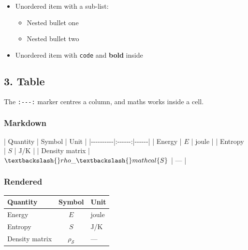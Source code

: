 \documentclass[
]{article}
\newenvironment{Shaded}{}{}
\newcommand{\NormalTok}[1]{#1}
\newcommand{\PreprocessorTok}[1]{\textcolor[rgb]{0.74,0.48,0.00}{#1}}
\newcounter{none} %
\providecommand{\tightlist}{%
  \setlength{\itemsep}{0pt}\setlength{\parskip}{0pt}}
\begin{document}
\begin{itemize}
\tightlist
\item
  Unordered item with a sub-list:

  \begin{itemize}
  \tightlist
  \item
    Nested bullet one
  \item
    Nested bullet two
  \end{itemize}
\item
  Unordered item with \texttt{code} and \textbf{bold} inside
\end{itemize}

\subsection{3. Table}\label{table}

The \texttt{:-\/-\/-:} marker centres a column, and maths works inside a
cell.

\subsubsection{Markdown}\label{markdown-2}

\begin{Shaded}
\begin{Highlighting}[]
\PreprocessorTok{|}\NormalTok{ Quantity }\PreprocessorTok{|}\NormalTok{ Symbol }\PreprocessorTok{|}\NormalTok{ Unit }\PreprocessorTok{|}
\PreprocessorTok{|{-}{-}{-}{-}{-}{-}{-}{-}{-}{-}|:{-}{-}{-}{-}{-}{-}:|{-}{-}{-}{-}{-}{-}|}
\PreprocessorTok{|}\NormalTok{ Energy }\PreprocessorTok{|}\NormalTok{ $E$ }\PreprocessorTok{|}\NormalTok{ joule }\PreprocessorTok{|}
\PreprocessorTok{|}\NormalTok{ Entropy }\PreprocessorTok{|}\NormalTok{ $S$ }\PreprocessorTok{|}\NormalTok{ J/K }\PreprocessorTok{|}
\PreprocessorTok{|}\NormalTok{ Density matrix }\PreprocessorTok{|}\NormalTok{ $\textbackslash{}rho\_\textbackslash{}mathcal\{S\}$ }\PreprocessorTok{|}\NormalTok{ — }\PreprocessorTok{|}
\end{Highlighting}
\end{Shaded}

\subsubsection{Rendered}\label{rendered-2}

{\def\LTcaptype{none} %
\begin{longtable}[]{@{}lcl@{}}
\toprule\noalign{}
Quantity & Symbol & Unit \\
\midrule\noalign{}
\endhead
\bottomrule\noalign{}
\endlastfoot
Energy & \(E\) & joule \\
Entropy & \(S\) & J/K \\
Density matrix & \(\rho_\mathcal{S}\) & --- \\
\end{longtable}
}
\end{document}
